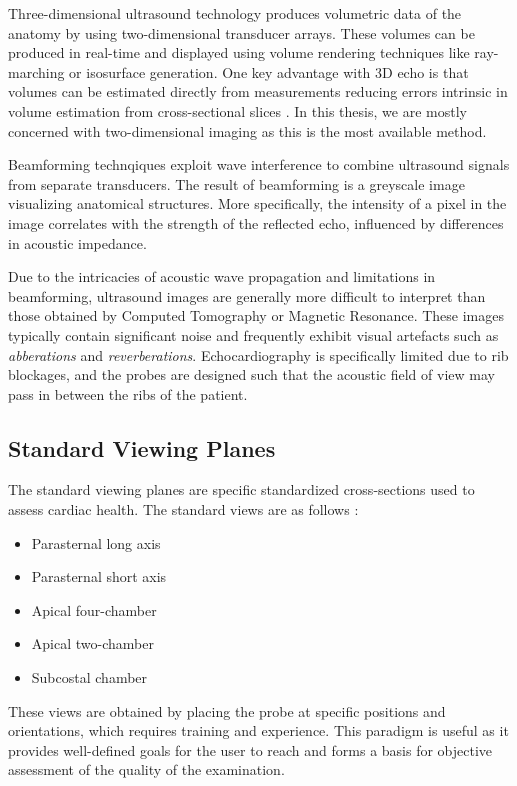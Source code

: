 \documentclass{article}
\begin{document}
Three-dimensional ultrasound technology produces volumetric data of the anatomy by using two-dimensional transducer arrays.
These volumes can be produced in real-time and displayed using volume rendering techniques like ray-marching or isosurface generation. One key advantage with 3D echo
is that volumes can be estimated directly from measurements reducing errors intrinsic in volume estimation from cross-sectional slices \cite{Shah2013}.
In this thesis, we are mostly concerned with two-dimensional imaging as this is the most available method.

Beamforming technqiques exploit wave interference to combine ultrasound signals from separate transducers. The result of beamforming is a
greyscale image visualizing anatomical structures. More specifically, the intensity of a pixel in the image correlates with the strength of the reflected echo, influenced by differences
in acoustic impedance.

Due to the intricacies of acoustic wave propagation and limitations in beamforming, ultrasound images are generally more difficult to interpret than those obtained by Computed Tomography or Magnetic Resonance.
These images typically contain significant noise and frequently exhibit visual artefacts such as \textit{abberations} and \textit{reverberations}. Echocardiography is specifically limited due to 
rib blockages, and the probes are designed such that the acoustic field of view may pass in between the ribs of the patient.

\subsection{Standard Viewing Planes}
The standard viewing planes are specific standardized cross-sections used to assess cardiac health.
The standard views are as follows \cite{otto2018echocardiography}:
\begin{itemize}
    \item Parasternal long axis
    \item Parasternal short axis
    \item Apical four-chamber
    \item Apical two-chamber
    \item Subcostal chamber
\end{itemize}

These views are obtained by placing the probe at specific positions and orientations, which requires
training and experience. This paradigm is useful as it provides well-defined goals
for the user to reach and forms a basis for objective assessment of the quality of the examination.
\end{document}
